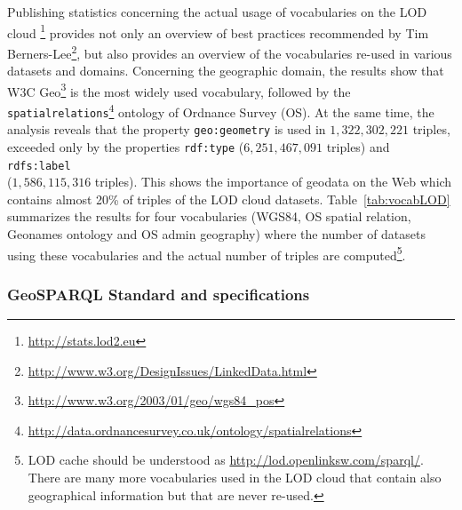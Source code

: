 Publishing statistics concerning the actual usage of vocabularies on the LOD cloud \footnote{\url{http://stats.lod2.eu}} \cite{demter-2012-ekaw} provides not only an overview of best practices recommended by Tim Berners-Lee\footnote{\url{http://www.w3.org/DesignIssues/LinkedData.html}}, but also provides an overview of the vocabularies re-used in various datasets and domains. Concerning the geographic domain, the results show that W3C Geo\footnote{\url{http://www.w3.org/2003/01/geo/wgs84_pos}} is the most widely used vocabulary, followed by the \texttt{spatialrelations}\footnote{\url{http://data.ordnancesurvey.co.uk/ontology/spatialrelations}} ontology of Ordnance Survey (OS). At the same time, the analysis reveals that the property \texttt{geo:geometry} is used in $1,322,302,221$ triples, exceeded only by the properties \texttt{rdf:type} ($6,251,467,091$ triples) and \texttt{rdfs:label}\\($1,586,115,316$ triples). This shows the importance of geodata on the Web which contains almost 20\% of triples of the LOD cloud datasets. Table~\ref{tab:vocabLOD} summarizes the results for four vocabularies (WGS84, OS spatial relation, Geonames ontology and OS admin geography) where the number of datasets using these vocabularies and the actual number of triples are computed\footnote{LOD cache should be understood as \url{http://lod.openlinksw.com/sparql/}. There are many more vocabularies used in the LOD cloud that contain also geographical information but that are never re-used.}.

\begin{table}[!htbp]
\end{table}

\subsubsection{GeoSPARQL Standard and specifications}
\label{sec:specgeosparql}

